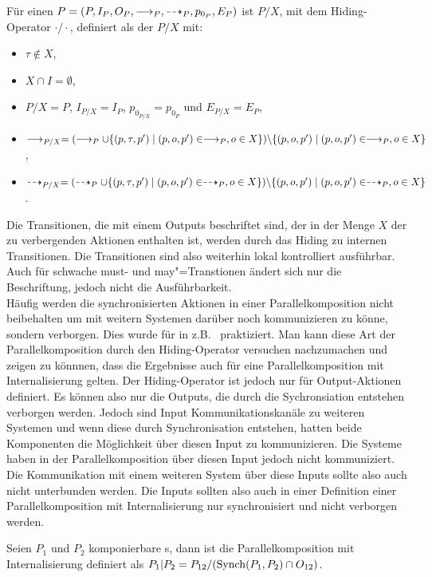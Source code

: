 \begin{Def}
  Für einen \MEIO{} $P = (P,I_P,O_P,\must _P, \may _P, p_{0_P}, E_P)$ ist
  $P/X$, mit dem Hiding-Operator $\cdot /\cdot$, definiert als der \MEIO{}
  $P/X$ mit:
  \begin{itemize}
    \item $\tau \notin X$,
    \item $X\cap I = \emptyset$,
    \item $P/X = P$, $I_{P/X} = I_P$, $p_{0_{P/X}} = p_{0_P}$ und $E_{P/X} =
      E_P$,
    \item $\must _{P/X} = (\must _P \cup \{(p,\tau,p')\mid (p,o,p')\in \must
      _P, o \in X\})\backslash \{(p,o,p')\mid (p,o,p')\in \must _P, o \in X\}$,
    \item $\may _{P/X} = (\may _P \cup \{(p,\tau,p')\mid (p,o,p')\in \may _P, o
      \in X\})\backslash \{(p,o,p')\mid (p,o,p')\in \may _P, o \in X\}$.
  \end{itemize}
\end{Def}

Die Transitionen, die mit einem Outputs beschriftet sind, der in der Menge $X$
der zu verbergenden Aktionen enthalten ist, werden durch das Hiding zu internen
Transitionen. Die Transitionen sind also weiterhin lokal kontrolliert
ausführbar. Auch für schwache must- und may"=Transtionen ändert sich nur die
Beschriftung, jedoch nicht die Ausführbarkeit.\\
Häufig werden die synchronisierten Aktionen in einer Parallelkomposition nicht
beibehalten um mit weitern Systemen darüber noch kommunizieren zu könne,
sondern verborgen. Dies wurde für \EIO{} in z.B.~\cite{Vogler2014EIO}
praktiziert. Man kann diese Art der Parallelkomposition durch den
Hiding-Operator versuchen nachzumachen und zeigen zu könnnen, dass die
Ergebnisse auch für eine Parallelkomposition mit Internalisierung gelten.
Der Hiding-Operator ist jedoch nur für Output-Aktionen definiert. Es können
also nur die Outputs, die durch die Sychronsiation entstehen verborgen werden.
Jedoch sind Input Kommunikationskanäle zu weiteren Systemen und wenn diese
durch Synchronisation entstehen, hatten beide Komponenten die Möglichkeit über
diesen Input zu kommunizieren. Die Systeme haben in der Parallelkomposition
über diesen Input jedoch nicht kommuniziert. Die Kommunikation mit einem
weiteren System über diese Inputs sollte also auch nicht unterbunden werden.
Die Inputs sollten also auch in einer Definition einer Parallelkomposition mit
Internalisierung nur synchronisiert und nicht verborgen werden.

\begin{Def}
  \label{DefParallelkompInternal}
  Seien $P_1$ und $P_2$ komponierbare \MEIO{}s, dann ist die
  Parallelkomposition mit Internalisierung definiert als $P_1|P_2 =
  P_{12}/(\mathrm{Synch} (P_1,P_2)\cap O_{12})$.
\end{Def}
